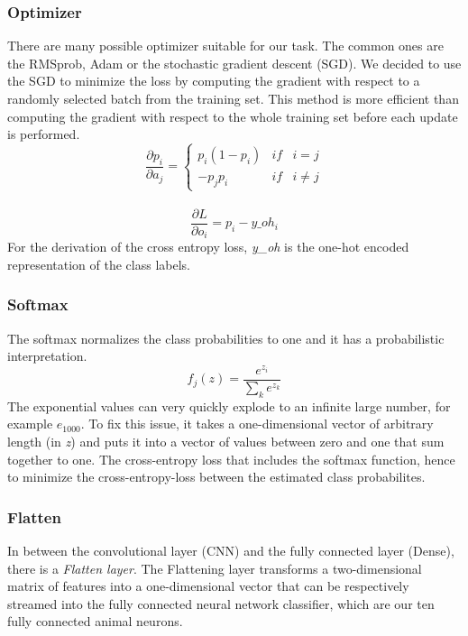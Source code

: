 \documentclass[journal]{IEEEtran}
\begin{document}
\subsubsection{Optimizer}
\noindent There are many possible optimizer suitable for our task. The common ones are the RMSprob, Adam or the stochastic gradient descent (SGD). We decided to use the SGD
to minimize the loss by computing the gradient with respect to a randomly selected batch from the training set. This method is more efficient than computing the gradient with respect to the whole training set before each update is performed.
\begin{equation}
\frac{\partial p_i}{\partial a_j}=\left\{\begin{matrix} p_i(1-p_i) & if & i=j\\ -p_j p_i & if & i\neq j \end{matrix}\right.
\end{equation} \\
\begin{equation}
\frac{\partial L}{\partial o_i}=p_i-y\_oh_i
\end{equation} 
For the derivation of the cross entropy loss, \textit{y\_oh} is the one-hot encoded representation of the class labels.
\subsubsection{Softmax}
\noindent The softmax normalizes the class probabilities to one and it has a probabilistic interpretation. 
\begin{equation}
f_{j}(z) = \frac{e^{z_{i}}}{\sum_{k} e^{z_{k}}}
\end{equation}
The exponential values can very quickly explode to an infinite large number, for example \(e_{1000}\). To fix this issue, it takes a one-dimensional vector of arbitrary length (in \textit{z}) and puts it into a vector of values between zero and one that sum together to one. The cross-entropy loss that includes the softmax function, hence to minimize the cross-entropy-loss between the estimated class probabilites. \\
\subsubsection{Flatten}
In between the convolutional layer (CNN) and the fully connected layer (Dense), there is a \textit{Flatten layer}. The Flattening layer transforms a two-dimensional matrix of features into a one-dimensional vector that can be respectively streamed into the fully connected neural network classifier, which are our ten fully connected animal neurons. \\
%
%
\end{document}
